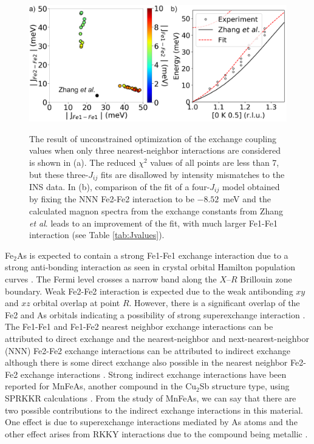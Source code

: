 \documentclass[letterpaper,10pt,doublespacing,edeposit]{uiucthesis2020}
\begin{document}
\begin{mainmatter}
\begin{figure}
\centering\includegraphics[width=0.8\columnwidth]{figures/ch8/magnon_spectra_refinement.png} \\
\caption{\label{fig:zhang_spinw_refinement}
The result of unconstrained optimization of the exchange coupling values when only three nearest-neighbor interactions are considered is shown in (a). The reduced $\chi^2$ values of all points are less than 7, but these three-$J_{ij}$ fits are disallowed by intensity mismatches to the INS data. In (b), comparison of the fit of a four-$J_{ij}$ model obtained by fixing the NNN Fe2-Fe2 interaction to be $-8.52$~meV and the calculated magnon spectra from the exchange constants from Zhang \emph{et al}. \cite{Zhang2013} leads to an improvement of the fit, with much larger Fe1-Fe1 interaction (see Table \ref{tab:Jvalues}). 
}
\end{figure}

Fe$_2$As is expected to contain a strong Fe1-Fe1 exchange interaction due to a strong anti-bonding interaction as seen in crystal orbital Hamilton population curves \cite{Zhang2013}.
The Fermi level crosses a narrow band along the $X$--$R$ Brillouin zone boundary. Weak Fe2-Fe2 interaction is expected due to the weak antibonding $xy$ and $xz$ orbital overlap at point $R$. However, there is a significant overlap of the Fe2 and As orbitals indicating a possibility of strong superexchange interaction \cite{Zhang2013}. The Fe1-Fe1 and Fe1-Fe2 nearest neighbor exchange interactions can be attributed to direct exchange and the nearest-neighbor and next-nearest-neighbor (NNN) Fe2-Fe2 exchange interactions can be attributed to indirect exchange although there is some direct exchange also possible in the nearest neighbor Fe2-Fe2 exchange interactions \cite{Zhang2013}.  Strong indirect exchange interactions have been reported for MnFeAs, another compound in the Cu$_2$Sb structure type, using SPRKKR calculations \cite{Zhang2015}. From the study of MnFeAs, we can say that there are two possible contributions to the indirect exchange interactions in this material. One effect is due to superexchange interactions mediated by As atoms and the other effect arises from RKKY interactions due to the compound being metallic \cite{Zhang2015}.



\end{mainmatter}
\end{document}
